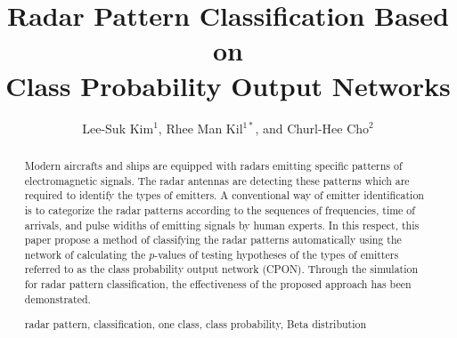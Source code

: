 \documentclass[runningheads,a4paper]{llncs}
\newcommand{\keywords}[1]{\par\addvspace\baselineskip
\noindent\keywordname\enspace\ignorespaces#1}
\begin{document}
\mainmatter  %

\title{Radar Pattern Classification Based on\protect\\
         Class Probability Output Networks}


%
%
\author{Lee-Suk Kim$^1$, Rhee Man Kil$^{1*}$, and Churl-Hee Cho$^2$}
%


%
%


\maketitle

\begin{abstract}
Modern aircrafts and ships are equipped with radars emitting specific patterns of electromagnetic signals. 
The radar antennas are detecting these patterns which are required to identify
the types of emitters. A conventional way of emitter identification is to categorize the radar patterns according to the sequences of
frequencies, time of arrivals, and pulse widiths of emitting signals by human experts. In this respect, this paper propose a method of
classifying the radar patterns automatically using the network of calculating the $p$-values of testing hypotheses of the types of emitters
referred to as the class probability output network (CPON). Through the simulation for radar pattern classification, the effectiveness of
the proposed approach has been demonstrated.


\keywords{radar pattern, classification, one class, class probability, Beta distribution}
\end{abstract}
\end{document}
